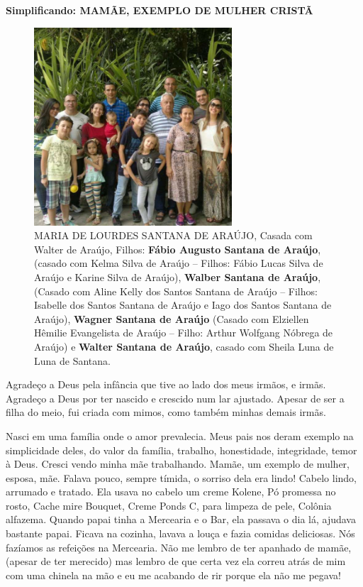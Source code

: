 \documentclass[
  brazil,
  a6paper,
  oneside,
  landscape,
  14pt]{scrbook}
\begin{document}
\textbf{Simplificando: MAMÃE, EXEMPLO DE MULHER CRISTÃ}

\begin{figure}
\centering
\includegraphics[width=2.90625in,height=2.90625in]{img/lourdes/image1.jpeg}
\caption{MARIA DE LOURDES SANTANA DE ARAÚJO, Casada com Walter de
Araújo, Filhos: \textbf{Fábio Augusto Santana de Araújo}, (casado com
Kelma Silva de Araújo -- Filhos: Fábio Lucas Silva de Araújo e Karine
Silva de Araújo), \textbf{Walber Santana de Araújo}, (Casado com Aline
Kelly dos Santos Santana de Araújo -- Filhos: Isabelle dos Santos
Santana de Araújo e Iago dos Santos Santana de Araújo), \textbf{Wagner
Santana de Araújo} (Casado com Elziellen Hêmilie Evangelista de Araújo
-- Filho: Arthur Wolfgang Nóbrega de Araújo) e \textbf{Walter Santana de
Araújo}, casado com Sheila Luna de Luna de Santana.}
\end{figure}

Agradeço a Deus pela infância que tive ao lado dos meus irmãos, e irmãs.
Agradeço a Deus por ter nascido e crescido num lar ajustado. Apesar de
ser a filha do meio, fui criada com mimos, como também minhas demais
irmãs.

Nasci em uma família onde o amor prevalecia. Meus pais nos deram exemplo
na simplicidade deles, do valor da família, trabalho, honestidade,
integridade, temor à Deus. Cresci vendo minha mãe trabalhando. Mamãe, um
exemplo de mulher, esposa, mãe. Falava pouco, sempre tímida, o sorriso
dela era lindo! Cabelo lindo, arrumado e tratado. Ela usava no cabelo um
creme Kolene, Pó promessa no rosto, Cache mire Bouquet, Creme Ponds C,
para limpeza de pele, Colônia alfazema. Quando papai tinha a Mercearia e
o Bar, ela passava o dia lá, ajudava bastante papai. Ficava na cozinha,
lavava a louça e fazia comidas deliciosas. Nós fazíamos as refeições na
Mercearia. Não me lembro de ter apanhado de mamãe, (apesar de ter
merecido) mas lembro de que certa vez ela correu atrás de mim com uma
chinela na mão e eu me acabando de rir porque ela não me pegava!
\end{document}
